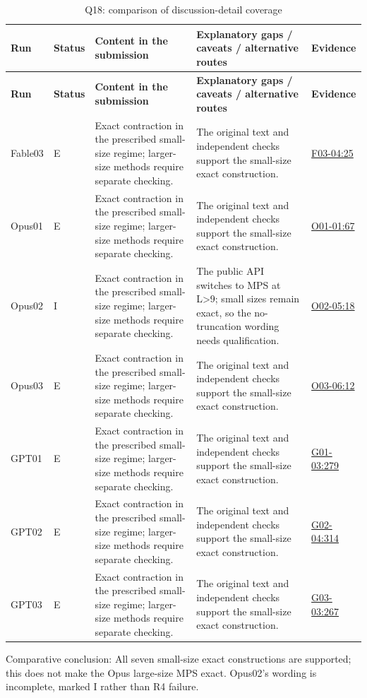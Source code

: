 \documentclass[11pt,a4paper]{article}
\begin{document}
{\fontsize{9.0}{12.6}\selectfont
\setlength{\tabcolsep}{2.5pt}
\begin{longtable}{>{\raggedright\arraybackslash}p{}>{\raggedright\arraybackslash}p{}>{\raggedright\arraybackslash}p{}>{\raggedright\arraybackslash}p{}>{\raggedright\arraybackslash}p{}}
\caption{Q18: comparison of discussion-detail coverage}\\
\toprule
\textbf{Run} & \textbf{Status} & \textbf{Content in the submission} & \textbf{Explanatory gaps /\allowbreak{} caveats /\allowbreak{} alternative routes} & \textbf{Evidence}\tabularnewline
\midrule
\endfirsthead
\toprule
\textbf{Run} & \textbf{Status} & \textbf{Content in the submission} & \textbf{Explanatory gaps /\allowbreak{} caveats /\allowbreak{} alternative routes} & \textbf{Evidence}\tabularnewline
\midrule
\endhead
{}Fable03 & E & Exact contraction in the prescribed small-size regime; larger-size methods require separate checking. & The original text and independent checks support the small-size exact construction. & \hyperref[src:F03-04]{F03-04:25}\tabularnewline
{}Opus01 & E & Exact contraction in the prescribed small-size regime; larger-size methods require separate checking. & The original text and independent checks support the small-size exact construction. & \hyperref[src:O01-01]{O01-01:67}\tabularnewline
{}Opus02 & I & Exact contraction in the prescribed small-size regime; larger-size methods require separate checking. & The public API switches to MPS at L>9; small sizes remain exact,\allowbreak{} so the no-truncation wording needs qualification. & \hyperref[src:O02-05]{O02-05:18}\tabularnewline
{}Opus03 & E & Exact contraction in the prescribed small-size regime; larger-size methods require separate checking. & The original text and independent checks support the small-size exact construction. & \hyperref[src:O03-06]{O03-06:12}\tabularnewline
{}GPT01 & E & Exact contraction in the prescribed small-size regime; larger-size methods require separate checking. & The original text and independent checks support the small-size exact construction. & \hyperref[src:G01-03]{G01-03:279}\tabularnewline
{}GPT02 & E & Exact contraction in the prescribed small-size regime; larger-size methods require separate checking. & The original text and independent checks support the small-size exact construction. & \hyperref[src:G02-04]{G02-04:314}\tabularnewline
{}GPT03 & E & Exact contraction in the prescribed small-size regime; larger-size methods require separate checking. & The original text and independent checks support the small-size exact construction. & \hyperref[src:G03-03]{G03-03:267}\tabularnewline
\bottomrule
\end{longtable}
}
Comparative conclusion: All seven small-size exact constructions are supported; this does not make the Opus large-size MPS exact. Opus02's wording is incomplete,\allowbreak{} marked I rather than R4 failure.
\end{document}
